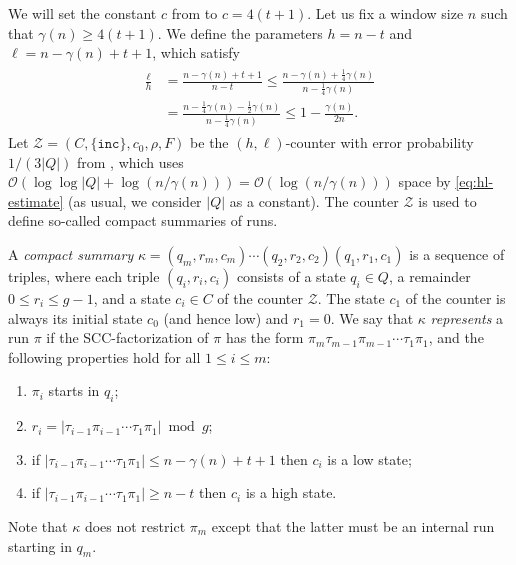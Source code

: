 \documentclass{theoretics}
\renewcommand{\O}{\mathcal{O}}
\newcommand{\BZ}{\mathcal{Z}}
\renewcommand{\geq}{\geqslant}
\renewcommand{\leq}{\leqslant}
\renewcommand{\ge}{\geq}
\renewcommand{\le}{\leq}
\begin{document}
We will set the constant $c$ from  to $c = 4(t+1)$.
Let us fix a window size $n$ such that $\gamma(n) \ge 4(t+1)$.
We define the parameters $h = n - t$ and $\ell = n - \gamma(n) + t + 1$, which satisfy
\begin{align}
\begin{split}
	\label{eq:hl-estimate}
	\frac{\ell}{h} &= \frac{n - \gamma(n) + t + 1}{n - t} \le \frac{n - \gamma(n) + \frac{1}{4}\gamma(n)}{n - \frac{1}{4} \gamma(n)}  \\
	&= \frac{n - \frac{1}{4}\gamma(n) - \frac{1}{2}\gamma(n)}{n - \frac{1}{4} \gamma(n)} \leq 1 -   \frac{\gamma(n)}{2n}.
\end{split}
\end{align}
Let $\BZ = (C,\{\mathtt{inc}\},c_0,\rho,F)$ be the $(h,\ell)$-counter with error probability $1/(3|Q|)$ from ,
which uses $\O(\log\log |Q| + \log(n/\gamma(n))) = \O(\log(n/\gamma(n)))$ space by \eqref{eq:hl-estimate} (as usual, we consider
$|Q|$ as a constant).
The counter $\BZ$ is used to define so-called compact summaries of runs. 

A {\em compact summary} $\kappa = (q_m, r_m, c_m) \cdots (q_2, r_2, c_2) (q_1, r_1, c_1)$ is a sequence of triples,
where each triple $(q_i, r_i, c_i)$ consists of a state $q_i \in Q$, a remainder $0 \le r_i \le g-1$,
and a state $c_i \in C$ of the counter $\BZ$. The state $c_1$ of the counter is always its initial state $c_0$ (and hence low)
and $r_1 = 0$.
We say that $\kappa$ {\em represents} a run $\pi$ if
the SCC-factorization of $\pi$ has the form $\pi_m \tau_{m-1} \pi_{m-1} \cdots \tau_1 \pi_1$,
and the following properties hold for all $1 \le i \le m$:
\begin{enumerate}[label=(C\arabic{*}), ref=(C\arabic{*})]
\item $\pi_i$ starts in $q_i$; \label{C1}
\item $r_i = |\tau_{i-1} \pi_{i-1} \cdots \tau_1 \pi_1| \bmod {g}$; \label{C2}
\item if $|\tau_{i-1} \pi_{i-1} \cdots \tau_1 \pi_1| \le n - \gamma(n) + t + 1$
then $c_i$ is a low state;\label{C3}
\item if $|\tau_{i-1} \pi_{i-1} \cdots \tau_1 \pi_1| \ge n-t$ then $c_i$ is a high state. \label{C4}
\end{enumerate}
Note that $\kappa$ does not restrict $\pi_m$ except that the latter must be an internal run
starting in $q_m$.
\end{document}
